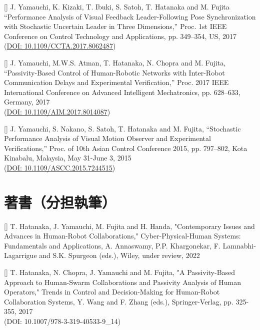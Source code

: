\documentclass[letterpaper]{article}
\newcounter{conf}
\newcounter{bookchapter}
\begin{document}
[]  
  J. Yamauchi, K. Kizaki, T. Ibuki, S. Satoh, T. Hatanaka and M. Fujita
  ``Performance Analysis of Visual Feedback Leader-Following Pose Synchronization with Stochastic Uncertain Leader in Three Dimensions,''
  Proc. 1st IEEE Conference on Control Technology and Applications, pp. 349--354, US, 2017 \\
  (\href{http://ieeexplore.ieee.org/document/8062487/}{DOI: 10.1109/CCTA.2017.8062487}) \\
\addtocounter{conf}{-1}

[]  
  J. Yamauchi, M.W.S. Atman, T. Hatanaka, N. Chopra and M. Fujita,
  ``Passivity-Based Control of Human-Robotic Networks with Inter-Robot Communication Delays and Experimental Verification,''
  Proc. 2017 IEEE International Conference on Advanced Intelligent Mechatronics, pp. 628--633, Germany, 2017 \\
  (\href{http://ieeexplore.ieee.org/document/8014087/}{DOI: 10.1109/AIM.2017.8014087}) \\
\addtocounter{conf}{-1}

[] 
  J. Yamauchi, S. Nakano, S. Satoh, T. Hatanaka and M. Fujita,
  ``Stochastic Performance Analysis of Visual Motion Observer and Experimental Verifications,''
  Proc. of 10th Asian Control Conference 2015, pp. 797--802, Kota Kinabalu, Malaysia, May 31-June 3, 2015 \\
  (\href{http://ieeexplore.ieee.org/document/7244515/}{DOI: 10.1109/ASCC.2015.7244515}) \\
\addtocounter{conf}{-1}



\section*{著書（分担執筆）}

[] 
  T. Hatanaka, J. Yamauchi, M. Fujita and H. Handa, 
  "Contemporary Issues and Advances in Human-Robot Collaborations," 
  Cyber-Physical-Human Systems: Fundamentals and Applications, A. Annaswamy, P.P. Khargonekar, F. Lamnabhi-Lagarrigue and S.K. Spurgeon (eds.), Wiley, under review, 2022 \\
\addtocounter{bookchapter}{-1}

[] 
  T. Hatanaka, N. Chopra, J. Yamauchi and M. Fujita, 
  "A Passivity-Based Approach to Human-Swarm Collaborations and Passivity Analysis of Human Operators," 
  Trends in Control and Decision-Making for Human-Robot Collaboration Systems, Y. Wang and F. Zhang (eds.), Springer-Verlag, pp. 325-355, 2017 \\
  (DOI: 10.1007/978-3-319-40533-9\_14) \\
\addtocounter{bookchapter}{-1}
\end{document}
